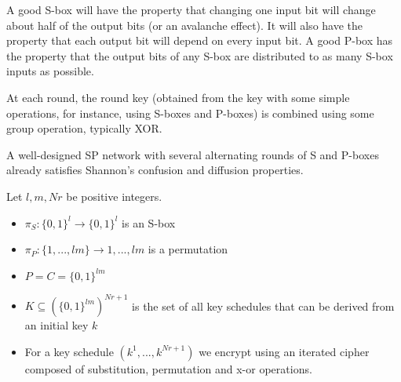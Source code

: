 A good S-box will have the property that changing one input bit will change about half of the output bits (or an avalanche effect).
It will also have the property that each output bit will depend on every input bit.
A good P-box has the property that the output bits of any S-box are distributed to as many S-box inputs as possible.

At each round, the round key (obtained from the key with some simple operations, for instance, using S-boxes and P-boxes)
is combined using some group operation, typically XOR.

A well-designed SP network with several alternating rounds of S and P-boxes already satisfies Shannon's confusion and diffusion properties.

\begin{example}
    Let $l,m,Nr$ be positive integers.
    \begin{itemize}
        \item $\pi_S : \{0,1\}^l \rightarrow \{0,1\}^l$ is an S-box
        \item $\pi_P : \{1,...,lm\} \rightarrow {1,...,lm}$ is a permutation
        \item $P=C=\{0,1\}^{lm}$
        \item $K \subseteq (\{0,1\}^{lm})^{Nr+1}$ is the set of all key schedules that can be derived from an initial key $k$
        \item For a key schedule $(k^1,...,k^{Nr+1})$ we encrypt using an iterated cipher composed of substitution, permutation and x-or operations.
    \end{itemize}
\end{example}

